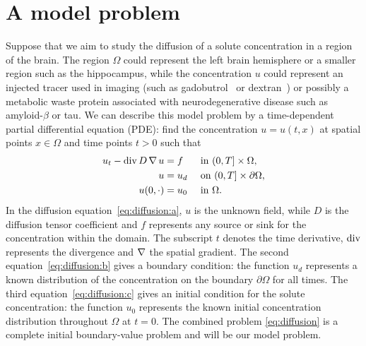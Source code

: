 \section{A model problem}

Suppose that we aim to study the diffusion of a solute concentration
in a region of the brain. The region $\Omega$ could represent the left
brain hemisphere or a smaller region such as the hippocampus, while
the concentration $u$ could represent an injected tracer used in
imaging (such as gadobutrol~\cite{ringstad2018brain} or
dextran~\cite{iliff2013cerebral}) or possibly a metabolic waste
protein associated with neurodegenerative disease such as
amyloid-$\beta$ or tau. We can describe this model problem by a
time-dependent partial differential equation (PDE): find the
concentration $u = u(t, x)$ at spatial points $x \in \Omega$ and time
points $t > 0$ such that
\begin{subequations}
  \label{eq:diffusion}
  \begin{align}
    \label{eq:diffusion:a}
    u_t - \operatorname{\mathrm{div}} D \operatorname{\nabla} u &= f &&\text{ in } (0, T] \times \Omega, \\
    \label{eq:diffusion:b}
    u &= u_d && \text{ on } (0, T] \times \partial \Omega, \\
    \label{eq:diffusion:c}
    u(0, \cdot) &= u_0 && \text{ in } \Omega.
  \end{align}
\end{subequations}
In the diffusion equation~\eqref{eq:diffusion:a}, $u$ is the unknown
field, while $D$ is the diffusion tensor coefficient and $f$
represents any source or sink for the concentration within the
domain. The subscript $t$ denotes the time derivative, $\operatorname{\mathrm{div}}$
represents the divergence and $\operatorname{\nabla}$ the spatial gradient. The second
equation~\eqref{eq:diffusion:b} gives a boundary condition: the
function $u_d$ represents a known distribution of the concentration on
the boundary $\partial \Omega$ for all times. The third
equation~\eqref{eq:diffusion:c} gives an initial condition for the
solute concentration: the function $u_0$ represents the known initial
concentration distribution throughout $\Omega$ at $t=0$. The combined
problem \eqref{eq:diffusion} is a complete initial boundary-value
problem and will be our model problem.


